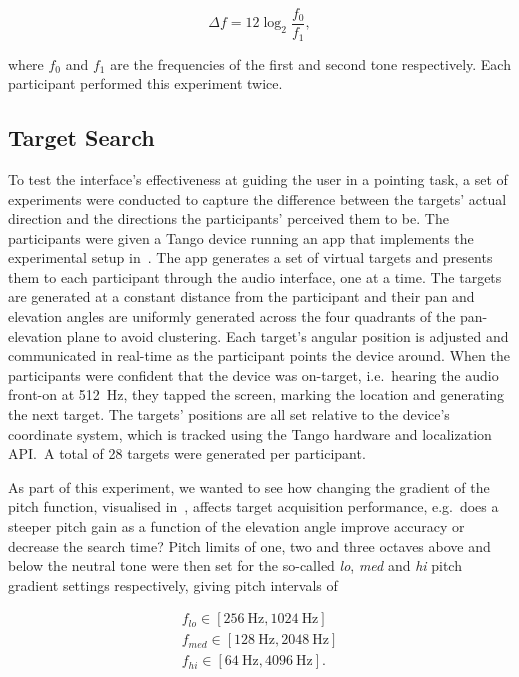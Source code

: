 \documentclass[acmsmall]{acmart}
\begin{document}
\begin{equation}
\label{eq:semitone-difference}
  \Delta f = 12\log_2\frac{f_0}{f_1}, 
\end{equation}

\noindent where $f_0$ and $f_1$ are the frequencies of the first and second tone respectively.
Each participant performed this experiment twice. 

\subsection{Target Search}\label{sec:target_search}

To test the interface's effectiveness at guiding the user in a pointing task, a set of experiments were conducted to capture the difference between the targets' actual direction and the directions the participants' perceived them to be.
The participants were given a Tango device running an app that implements the experimental setup in~. The app generates a set of virtual targets and presents them to each participant through the audio interface, one at a time. 
The targets are generated at a constant distance from the participant and their pan and elevation angles are uniformly generated across the four quadrants of the pan-elevation plane to avoid clustering.
Each target's angular position is adjusted and communicated in real-time as the participant points the device around. 
When the participants were confident that the device was on-target, i.e.~hearing the audio front-on at \SI{512}{\hertz}, they tapped the screen, marking the location and generating the next target.
The targets' positions are all set relative to the device's coordinate system, which is tracked using the Tango hardware and localization API.\
A total of 28 targets were generated per participant. 

As part of this experiment, we wanted to see how changing the gradient of the pitch function, visualised in~, affects target acquisition performance, e.g.\ does a steeper pitch gain as a function of the elevation angle improve accuracy or decrease the search time?
Pitch limits of one, two and three octaves above and below the neutral tone were then set for the so-called \textit{lo}, \textit{med} and \textit{hi} pitch gradient settings respectively, giving pitch intervals of

\begin{gather*}
  f_{lo}\in[\SI{256}{\hertz}, \SI{1024}{\hertz}]\\
  f_{med}\in[\SI{128}{\hertz}, \SI{2048}{\hertz}]\\
  f_{hi}\in[\SI{64}{\hertz}, \SI{4096}{\hertz}].
\end{gather*}
\end{document}
